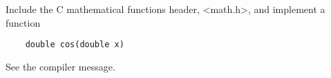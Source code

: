 
Include the C mathematical functions header, <math.h>, and implement a function

 \begin{verbatim}
    double cos(double x) 
 \end{verbatim}

See the compiler message.
